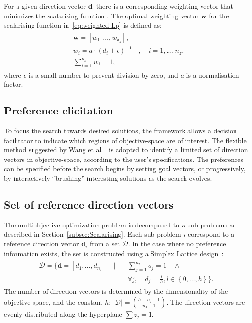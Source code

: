 \documentclass[a4paper]{article}
\newcommand{\brs}[1]{\left[{#1}\right]} %
\newcommand{\brr}[1]{{\left({#1}\right)}} %
\newcommand{\brf}[1]{\left\lbrace{#1}\right\rbrace} %
\newcommand{\vd}{\ensuremath{\mathbf{d}}} %
\newcommand{\DSet}{\ensuremath{\mathcal{D}}} %
\begin{document}
For a given direction vector \vd\ there is a corresponding weighting vector that minimizes the scalarising function \cite{giagkiozis2014generalized}. The optimal weighting vector $\mathbf{w}$ for the scalarising function in~\eqref{eq:weighted Lp} is defined as:
\begin{align}
\begin{split}
	&\mathbf{w}=\brs{w_1,\ldots,w_{n_z}},\\
	&w_i=a\cdot\brr{d_i+\epsilon}^{-1} \quad , \quad i=1,\ldots,n_z,\\
	&\sum_{i=1}^{n_z} w_i=1,
\end{split}
\end{align}
where $\epsilon$ is a small number to prevent division by zero, and $a$ is a normalisation factor.

\subsection{Preference elicitation}
\label{subsec:preference}
To focus the search towards desired solutions, the framework allows a decision facilitator to indicate which regions of objective-space are of interest. The flexible method suggested by Wang et al.~\cite{Wang2013Whatever} is adopted to identify a limited set of direction vectors in objective-space, according to the user's specifications. The preferences can be specified before the search begins by setting goal vectors, or progressively, by interactively ``brushing'' interesting solutions as the search evolves.

\subsection{Set of reference direction vectors}
\label{sec:Simplex Lattice}
The multiobjective optimization problem is decomposed to $n$ sub-problems as described in Section~\ref{subsec:Scalarising}. Each sub-problem $i$ correspond to a reference direction vector $\vd_i$ from a set $\DSet$. In the case where no preference information exists, the set is constructed using a Simplex Lattice design~\cite{Scheffe1958Experiments}:
\begin{align}
	\label{eq:SimplexLattice}
	\begin{split}
		\DSet = \Biggl\lbrace\vd=\brs{d_1,\ldots,d_{n_z}}\quad \vert \quad &\sum_{j=1}^{n_z} d_j = 1 \quad \wedge \\
		& \forall j, \quad d_j = \frac{l}{h}, l\in\brf{0,\ldots,h} \Biggr\rbrace.
	\end{split}
\end{align}
The number of direction vectors is determined by the dimensionality of the objective space, and the constant $h$: $\vert\DSet\vert = \binom{h+n_z-1}{n_z-1}$. The direction vectors are evenly distributed along the hyperplane $\sum z_j = 1$.
\end{document}

